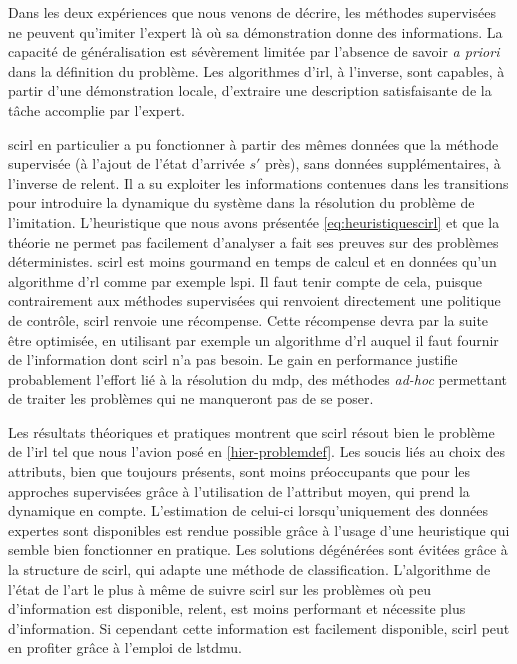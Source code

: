 \documentclass[frenchb,a4paper,justified,notoc]{tufte-book}
\begin{document}
    Dans les deux expériences que nous venons de décrire, les méthodes supervisées ne peuvent qu'imiter l'expert là où sa démonstration donne des informations. La capacité de généralisation est sévèrement limitée par l'absence de savoir \emph{a priori} dans la définition du problème. Les algorithmes d'\gls{irl}, à l'inverse, sont capables, à partir d'une démonstration locale, d'extraire une description satisfaisante de la tâche accomplie par l'expert.

    \gls{scirl} en particulier a pu fonctionner à partir des mêmes données que la méthode supervisée (à l'ajout de l'état d'arrivée $s'$ près), sans données supplémentaires, à l'inverse de \gls{relent}. Il a su exploiter les informations contenues dans les transitions pour introduire la dynamique du système dans la résolution du problème de l'imitation. L'heuristique que nous avons présentée \autoref{eq:heuristiquescirl} et que la théorie ne permet pas facilement d'analyser a fait ses preuves sur des problèmes déterministes. \gls{scirl} est moins gourmand en temps de calcul et en données qu'un algorithme d'\gls{rl} comme par exemple \gls{lspi}. Il faut tenir compte de cela, puisque contrairement aux méthodes supervisées qui renvoient directement une politique de contrôle, \gls{scirl} renvoie une récompense. Cette récompense devra par la suite être optimisée, en utilisant par exemple un algorithme d'\gls{rl} auquel il faut fournir de l'information dont \gls{scirl} n'a pas besoin. Le gain en performance justifie probablement l'effort lié à la résolution du \gls{mdp}, des méthodes \emph{ad-hoc} permettant de traiter les problèmes qui ne manqueront pas de se poser.
   
    Les résultats théoriques et pratiques montrent que \gls{scirl} résout bien le problème de l'\gls{irl} tel que nous l'avion posé en \autoref{hier-problemdef}. Les soucis liés au choix des attributs, bien que toujours présents, sont moins préoccupants que pour les approches supervisées grâce à l'utilisation de l'attribut moyen, qui prend la dynamique en compte. L'estimation de celui-ci lorsqu'uniquement des données expertes sont disponibles est rendue possible grâce à l'usage d'une heuristique qui semble bien fonctionner en pratique. Les solutions dégénérées sont évitées grâce à la structure de \gls{scirl}, qui adapte une méthode de classification. L'algorithme de l'état de l'art le plus à même de suivre \gls{scirl} sur les problèmes où peu d'information est disponible, \gls{relent}, est moins performant et nécessite plus d'information. Si cependant cette information est facilement disponible, \gls{scirl} peut en profiter grâce à l'emploi de \gls{lstdmu}.
\end{document}
